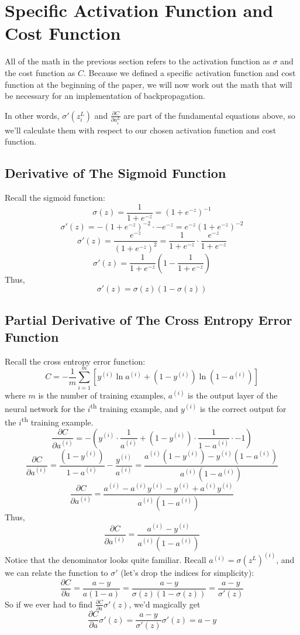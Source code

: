 \documentclass[11pt]{article}
\begin{document}
\section{Specific Activation Function and Cost Function}

All of the math in the previous section refers to the activation function as $\sigma$ and the cost function as $C$. Because we defined a specific activation function and cost function at the beginning of the paper, we will now work out the math that will be necessary for an implementation of backpropagation.

In other words, $\sigma'(z_i^L)$ and $\frac{\partial C}{\partial a_i^L}$ are part of the fundamental equations above, so we'll calculate them with respect to our chosen activation function and cost function.

\subsection{Derivative of The Sigmoid Function}
Recall the sigmoid function:
\[\sigma(z) = \frac{1}{1 + e^{-z}} = \left(1 + e^{-z}\right)^{-1}\]
\[\sigma'(z) = -\left(1 + e^{-z}\right)^{-2} \cdot -e^{-z} = e^{-z} \left(1 + e^{-z}\right)^{-2}\]
\[\sigma'(z) = \frac{e^{-z}}{\left(1 + e^{-z}\right)^{2}} = \frac{1}{1 + e^{-z}} \cdot \frac{e^{-z}}{1 + e^{-z}}\]
\[\sigma'(z) = \frac{1}{1 + e^{-z}} \left(1 - \frac{1}{1 + e^{-z}}\right)\]
Thus,
\[\sigma'(z) = \sigma(z) \left(1 - \sigma(z)\right)\]

\subsection{Partial Derivative of The Cross Entropy Error Function}
Recall the cross entropy error function:
\[C = - \frac{1}{m} \sum_{i = 1}^m \left[y^{(i)} \ln a^{(i)} + (1 - y^{(i)}) \ln \left(1 - a^{(i)}\right)\right]\]
where $m$ is the number of training examples, $a^{(i)}$ is the output layer of the neural network for the $i$\textsuperscript{th} training example, and $y^{(i)}$ is the correct output for the $i$\textsuperscript{th} training example.
\[\frac{\partial C}{\partial a^{(i)}} = -\left(y^{(i)} \cdot \frac{1}{a^{(i)}} + (1 - y^{(i)}) \cdot \frac{1}{1 - a^{(i)}} \cdot -1\right)\]
\[\frac{\partial C}{\partial a^{(i)}} = \frac{\left(1 - y^{(i)}\right)}{1 - a^{(i)}} - \frac{y^{(i)}}{a^{(i)}} = \frac{a^{(i)}\left(1 - y^{(i)}\right) - y^{(i)}\left(1 - a^{(i)}\right)}{a^{(i)} \left(1 - a^{(i)}\right)}\]
\[\frac{\partial C}{\partial a^{(i)}} = \frac{a^{(i)} - a^{(i)} y^{(i)} - y^{(i)} + a^{(i)} y^{(i)}}{a^{(i)} \left(1 - a^{(i)}\right)}\]
Thus,
\[\frac{\partial C}{\partial a^{(i)}} = \frac{a^{(i)} - y^{(i)}}{a^{(i)} \left(1 - a^{(i)}\right)}\]
Notice that the denominator looks quite familiar. Recall $a^{(i)} = \sigma\left(z^L\right)^{(i)}$, and we can relate the function to $\sigma'$ (let's drop the indices for simplicity):
\[\frac{\partial C}{\partial a} = \frac{a - y}{a (1 - a)} = \frac{a - y}{\sigma(z) \left(1 - \sigma(z)\right)} = \frac{a - y}{\sigma'(z)}\]
So if we ever had to find $\frac{\partial C}{\partial a} \sigma'(z)$, we'd magically get
\[\frac{\partial C}{\partial a} \sigma'(z) = \frac{a - y}{\sigma'(z)} \sigma'(z) = a - y\]
\end{document}
